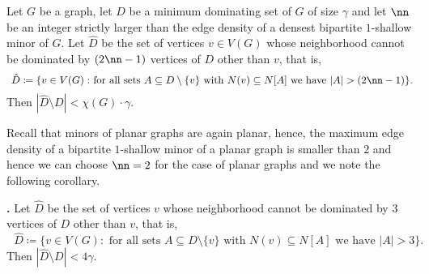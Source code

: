 \begin{lemma}\label{lenzen-improved}
  Let $G$ be a graph, let $D$ be a minimum dominating set of $G$ of
  size $\gamma$ and let $\nn$ be an integer strictly larger than the
  edge density of a densest bipartite $1$-shallow minor of $G$. Let
  $\hat{D}$ be the set of vertices $v\in V(G)$ whose neighborhood
  cannot be dominated by $(2\nn-1)$ vertices of $D$ other than $v$,
  that is,
  \[
    \text{ $\hat{D}\coloneqq \{v\in V(G) :$ for all sets
      $A\subseteq D\setminus \{v\}$ with $N(v)\subseteq N[A]$ we have
      $|A|> (2\nn-1)\}$.}
  \]
  Then $|\hat{D}\setminus D| < \chi(G)\cdot\gamma$.
\end{lemma}

Recall that minors of planar graphs are again planar, hence, the
maximum edge density of a bipartite $1$-shallow minor of a planar
graph is smaller than $2$ and hence we can choose $\nn=2$ for the case
of planar graphs and we note the following corollary.
\begin{cor}\label{lenzen-improved-planar}\hspace{-1.7mm}\textbf{.}
  Let $\hat{D}$ be the set of vertices $v$ whose neighborhood cannot
  be dominated by $3$ vertices of $D$ other than $v$, that is,
  \[
    \text{ $\hat{D}\coloneqq \{v\in V(G) :$ for all sets
      $A\subseteq D\setminus \{v\}$ with $N(v)\subseteq N[A]$ we have
      $|A|>3\}$.}
  \]
  Then $|\hat{D}\setminus D| < 4\gamma$.
\end{cor}
%
%

